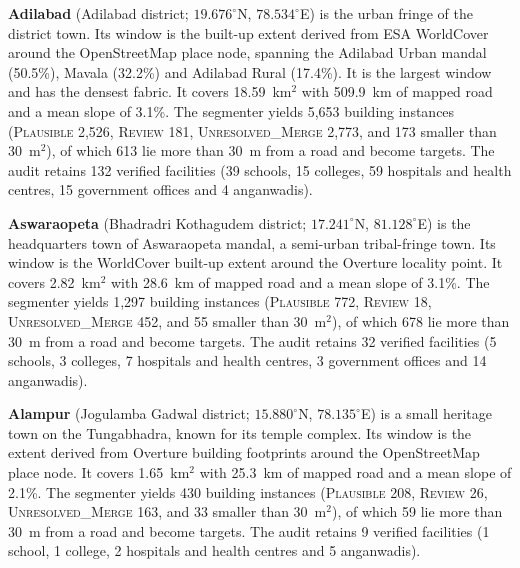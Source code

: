 \documentclass[preprint,12pt]{elsarticle}
\begin{document}
\textbf{Adilabad} (Adilabad district; $19.676^{\circ}$N, $78.534^{\circ}$E) is the urban fringe of the district town. Its window is the built-up extent derived from ESA WorldCover around the OpenStreetMap place node, spanning the Adilabad Urban mandal (50.5\%), Mavala (32.2\%) and Adilabad Rural (17.4\%). It is the largest window and has the densest fabric. It covers 18.59~km$^2$ with 509.9~km of mapped road and a mean slope of 3.1\%. The segmenter yields 5{,}653 building instances (\textsc{Plausible} 2{,}526, \textsc{Review} 181, \textsc{Unresolved\_Merge} 2{,}773, and 173 smaller than 30~m$^2$), of which 613 lie more than 30~m from a road and become targets. The audit retains 132 verified facilities (39 schools, 15 colleges, 59 hospitals and health centres, 15 government offices and 4 anganwadis). 

\textbf{Aswaraopeta} (Bhadradri Kothagudem district; $17.241^{\circ}$N, $81.128^{\circ}$E) is the headquarters town of Aswaraopeta mandal, a semi-urban tribal-fringe town. Its window is the WorldCover built-up extent around the Overture locality point.  It covers 2.82~km$^2$ with 28.6~km of mapped road and a mean slope of 3.1\%. The segmenter yields 1{,}297 building instances (\textsc{Plausible} 772, \textsc{Review} 18, \textsc{Unresolved\_Merge} 452, and 55 smaller than 30~m$^2$), of which 678 lie more than 30~m from a road and become targets. The audit retains 32 verified facilities (5 schools, 3 colleges, 7 hospitals and health centres, 3 government offices and 14 anganwadis). 

\textbf{Alampur} (Jogulamba Gadwal district; $15.880^{\circ}$N, $78.135^{\circ}$E) is a small heritage town on the Tungabhadra, known for its temple complex. Its window is the extent derived from Overture building footprints around the OpenStreetMap place node.  It covers 1.65~km$^2$ with 25.3~km of mapped road and a mean slope of 2.1\%. The segmenter yields 430 building instances (\textsc{Plausible} 208, \textsc{Review} 26, \textsc{Unresolved\_Merge} 163, and 33 smaller than 30~m$^2$), of which 59 lie more than 30~m from a road and become targets. The audit retains 9 verified facilities (1 school, 1 college, 2 hospitals and health centres and 5 anganwadis). 
\end{document}
